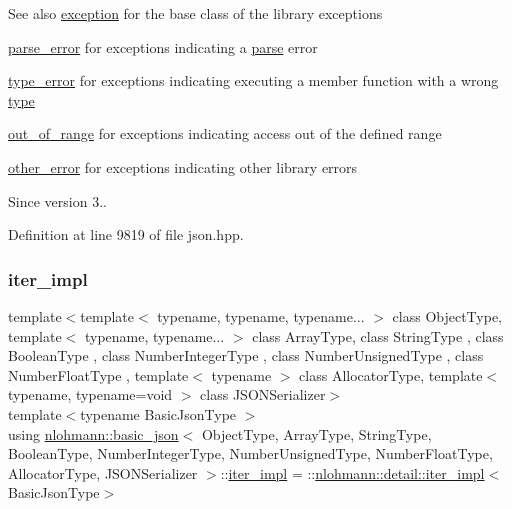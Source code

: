 \begin{DoxySeeAlso}{See also}
\hyperlink{classnlohmann_1_1basic__json_a9a0aced019cb1d65bb49703406c84970}{exception} for the base class of the library exceptions 

\hyperlink{classnlohmann_1_1basic__json_af1efc2468e6022be6e35fc2944cabe4d}{parse\+\_\+error} for exceptions indicating a \hyperlink{classnlohmann_1_1basic__json_aa9676414f2e36383c4b181fe856aa3c0}{parse} error 

\hyperlink{classnlohmann_1_1basic__json_a4010e8e268fefd86da773c10318f2902}{type\+\_\+error} for exceptions indicating executing a member function with a wrong \hyperlink{classnlohmann_1_1basic__json_a2b2d781d7f2a4ee41bc0016e931cadf7}{type} 

\hyperlink{classnlohmann_1_1basic__json_a28f7c2f087274a0012eb7a2333ee1580}{out\+\_\+of\+\_\+range} for exceptions indicating access out of the defined range 

\hyperlink{classnlohmann_1_1basic__json_a3333a5a8714912adda33a35b369f7b3d}{other\+\_\+error} for exceptions indicating other library errors
\end{DoxySeeAlso}
\begin{DoxySince}{Since}
version 3.. 
\end{DoxySince}


Definition at line 9819 of file json.\+hpp.

\mbox{\label{classnlohmann_1_1basic__json_abfd677a136936c16adf01e335f6a7a72}} 
\subsubsection{\texorpdfstring{iter\+\_\+impl}{iter\_impl}}
{\footnotesize\ttfamily template$<$template$<$ typename, typename, typename... $>$ class Object\+Type, template$<$ typename, typename... $>$ class Array\+Type, class String\+Type , class Boolean\+Type , class Number\+Integer\+Type , class Number\+Unsigned\+Type , class Number\+Float\+Type , template$<$ typename $>$ class Allocator\+Type, template$<$ typename, typename=void $>$ class J\+S\+O\+N\+Serializer$>$ \\
template$<$typename Basic\+Json\+Type $>$ \\
using \hyperlink{classnlohmann_1_1basic__json}{nlohmann\+::basic\+\_\+json}$<$ Object\+Type, Array\+Type, String\+Type, Boolean\+Type, Number\+Integer\+Type, Number\+Unsigned\+Type, Number\+Float\+Type, Allocator\+Type, J\+S\+O\+N\+Serializer $>$\+::\hyperlink{classnlohmann_1_1basic__json_abfd677a136936c16adf01e335f6a7a72}{iter\+\_\+impl} =  \+::\hyperlink{classnlohmann_1_1detail_1_1iter__impl}{nlohmann\+::detail\+::iter\+\_\+impl}$<$Basic\+Json\+Type$>$\hspace{0.3cm}{\ttfamily [private]}}



